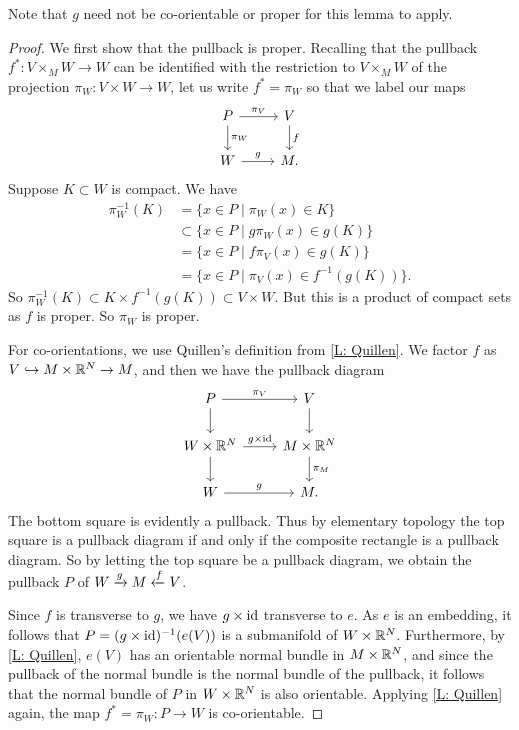 Note that $g$ need not be co-orientable or proper for this lemma to apply.

\begin{proof}
	We first show that the pullback is proper.
	Recalling that the pullback $f^*:V\times_MW\to W$ can be identified with the restriction to $V\times_MW$ of the projection $\pi_W:V\times W\to W$, let us write $f^*=\pi_W$ so that we label our maps
	\[
	\begin{tikzcd}
		P \arrow[r, "\pi_V"] \arrow[d, "\pi_W"] & V \arrow[d, "f"] \\
		W \arrow[r, "g"] & M.
	\end{tikzcd}
	\]
	Suppose $K \subset W$ is compact.
	We have
	\begin{align*}
		\pi_W^{-1}(K)& = \{x \in P \mid \pi_W(x) \in K\}\\
		& \subset \{x \in P \mid g\pi_W(x) \in g(K)\} \\
		& = \{x \in P \mid f\pi_V(x) \in g(K)\} \\
		& = \{x \in P \mid \pi_V(x) \in f^{-1}(g(K))\}.
	\end{align*}
	So $\pi_W^{-1}(K) \subset K \times f^{-1}(g(K)) \subset V \times W$.
	But this is a product of compact sets as $f$ is proper.
	So $\pi_W$ is proper.

	For co-orientations, we use Quillen's definition from \cref{L: Quillen}.
	We factor $f$ as $V \hookrightarrow M \times \mathbb{R}^N \to M$, and then we have the pullback diagram
	\begin{equation}\label{D: pullback}
		\begin{tikzcd}
			P \arrow[r, "\pi_V"] \arrow[d] & V \arrow[d] \\
			W \times \R^N \arrow[r, "g \times \id"] \arrow[d] & M \times \R^N \arrow[d, "\pi_M"] \\
			W \arrow[r, "g"] & M.
		\end{tikzcd}
	\end{equation}
	The bottom square is evidently a pullback.
	Thus by elementary topology the top square is a pullback diagram if and only if the composite rectangle is a pullback diagram.
	So by letting the top square be a pullback diagram, we obtain the pullback $P$ of $W \xrightarrow{g} M\xleftarrow{f} V$.

	Since $f$ is transverse to $g$, we have $g \times \mathrm{id}$ transverse to $e$.
	As $e$ is an embedding, it follows that $P = (g \times \mathrm{id})^{-1}(e(V))$ is a submanifold of $W \times \mathbb{R}^N$.
	Furthermore, by \cref{L: Quillen}, $e(V)$ has an orientable normal bundle in $M \times \mathbb{R}^N$, and since the pullback of the normal bundle is the normal bundle of the pullback, it follows that the normal bundle of $P$ in $W \times \mathbb{R}^N$ is also orientable.
	Applying \cref{L: Quillen} again, the map $f^* = \pi_W \colon P \to W$ is co-orientable.
\end{proof}

